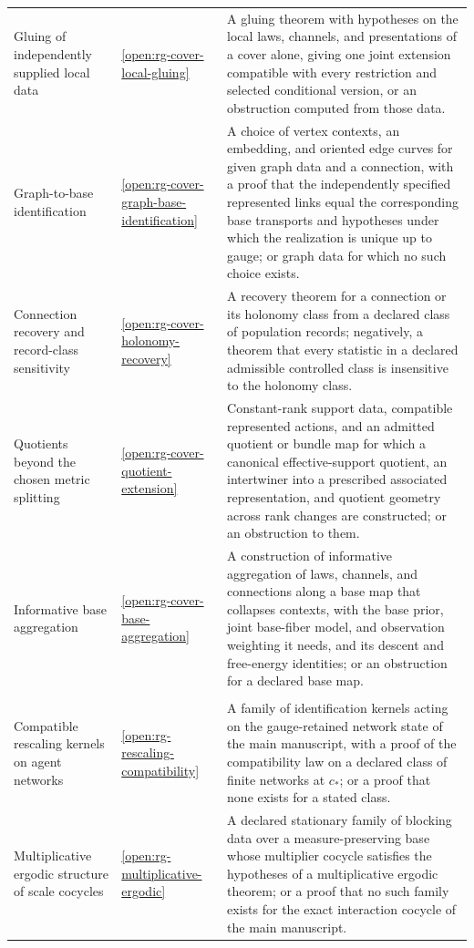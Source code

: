 {\begin{longtable}{@{}>{\raggedright\arraybackslash}p{}
>{\raggedright\arraybackslash}p{}
>{\raggedright\arraybackslash}p{}@{}}
Gluing of independently supplied local data & \cref{open:rg-cover-local-gluing} & A gluing theorem with hypotheses on the local laws, channels, and presentations of a cover alone, giving one joint extension compatible with every restriction and selected conditional version, or an obstruction computed from those data. \\
Graph-to-base identification & \cref{open:rg-cover-graph-base-identification} & A choice of vertex contexts, an embedding, and oriented edge curves for given graph data and a connection, with a proof that the independently specified represented links equal the corresponding base transports and hypotheses under which the realization is unique up to gauge; or graph data for which no such choice exists. \\
Connection recovery and record-class sensitivity & \cref{open:rg-cover-holonomy-recovery} & A recovery theorem for a connection or its holonomy class from a declared class of population records; negatively, a theorem that every statistic in a declared admissible controlled class is insensitive to the holonomy class. \\
Quotients beyond the chosen metric splitting & \cref{open:rg-cover-quotient-extension} & Constant-rank support data, compatible represented actions, and an admitted quotient or bundle map for which a canonical effective-support quotient, an intertwiner into a prescribed associated representation, and quotient geometry across rank changes are constructed; or an obstruction to them. \\
Informative base aggregation & \cref{open:rg-cover-base-aggregation} & A construction of informative aggregation of laws, channels, and connections along a base map that collapses contexts, with the base prior, joint base-fiber model, and observation weighting it needs, and its descent and free-energy identities; or an obstruction for a declared base map. \\
\multicolumn{3}{@{}l}{\textbf{Part B-II: infinite networks and Wilsonian asymptotics}} \\
Compatible rescaling kernels on agent networks & \cref{open:rg-rescaling-compatibility} & A family of identification kernels acting on the gauge-retained network state of the main manuscript, with a proof of the compatibility law on a declared class of finite networks at $c_*$; or a proof that none exists for a stated class. \\
Multiplicative ergodic structure of scale cocycles & \cref{open:rg-multiplicative-ergodic} & A declared stationary family of blocking data over a measure-preserving base whose multiplier cocycle satisfies the hypotheses of a multiplicative ergodic theorem; or a proof that no such family exists for the exact interaction cocycle of the main manuscript. \\

\end{longtable}}
